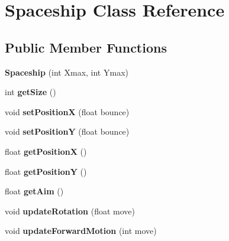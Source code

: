 \hypertarget{class_spaceship}{}\section{Spaceship Class Reference}
\label{class_spaceship}
\subsection*{Public Member Functions}
\begin{DoxyCompactItemize}
\item 
\mbox{\label{class_spaceship_a5e39fffde9fdb4113024cbf9d5c72e59}} 
{\bfseries Spaceship} (int Xmax, int Ymax)
\item 
\mbox{\label{class_spaceship_a32d88179c5aa6813a4ae0875985a0d9c}} 
int {\bfseries get\+Size} ()
\item 
\mbox{\label{class_spaceship_a2ffef2eece3d8a100e7b6a64096bd75a}} 
void {\bfseries set\+PositionX} (float bounce)
\item 
\mbox{\label{class_spaceship_a34da26c7a1b026f4b124c87e76412bdc}} 
void {\bfseries set\+PositionY} (float bounce)
\item 
\mbox{\label{class_spaceship_a7d1e35a6c75a11962f99f8117de08a05}} 
float {\bfseries get\+PositionX} ()
\item 
\mbox{\label{class_spaceship_ae2c2491b68c5287b36b47e1e492544ec}} 
float {\bfseries get\+PositionY} ()
\item 
\mbox{\label{class_spaceship_a5499bedd2d106eb5dcce26c959ea8be8}} 
float {\bfseries get\+Aim} ()
\item 
\mbox{\label{class_spaceship_a69914912a11e500c99d5a2df56a64c3c}} 
void {\bfseries update\+Rotation} (float move)
\item 
\mbox{\label{class_spaceship_aa3e17345887d355b270f2f20b94ef3c2}} 
void {\bfseries update\+Forward\+Motion} (int move)
\item 
\mbox{\label{class_spaceship_ab51e40709d9e83e0c096fd265110a21c}} 

\end{DoxyCompactItemize}
